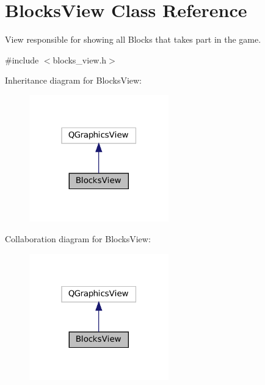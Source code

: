 \hypertarget{class_blocks_view}{}\section{Blocks\+View Class Reference}
\label{class_blocks_view}


View responsible for showing all Blocks that takes part in the game.  




{\ttfamily \#include $<$blocks\+\_\+view.\+h$>$}



Inheritance diagram for Blocks\+View\+:
\nopagebreak
\begin{figure}[H]
\begin{center}
\leavevmode
\includegraphics[width=171pt]{class_blocks_view__inherit__graph}
\end{center}
\end{figure}


Collaboration diagram for Blocks\+View\+:
\nopagebreak
\begin{figure}[H]
\begin{center}
\leavevmode
\includegraphics[width=171pt]{class_blocks_view__coll__graph}
\end{center}
\end{figure}

